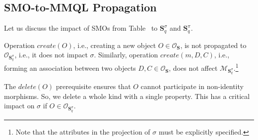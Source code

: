 \subsection{SMO-to-MMQL Propagation}


Let us discuss the impact of SMOs from Table~ to $\mathbf{S}_q^{\sigma}$ and $\mathbf{S}_q^{\pi}$. 

Operation $\textit{create}(O)$, i.e., creating a new object $O \in \mathcal{O}_\mathbf{S}$, is not propagated to $\mathcal{O}_{\mathbf{S}_q^{\sigma}}$, i.e., it does not impact $\sigma$.
Similarly, operation $\textit{create}(m, D, C)$, i.e., forming an association between two objects $D,C \in \mathcal{O}_\mathbf{S}$, does not affect $\mathcal{M}_{\mathbf{S}_q^{\sigma}}$.\footnote{Note that the attributes in the projection of $\sigma$ must be explicitly specified.}


The $delete(O)$ prerequisite ensures that $O$ cannot participate in non-identity morphisms. So, we delete a whole kind with a single property. This has a critical impact on $\sigma$ if $O \in \mathcal{O}_{\mathbf{S}_q^{\sigma}}$. 




